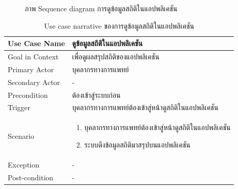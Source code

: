 \documentclass[12pt,oneside,openright,a4paper]{cpe-thai-project}
\begin{document}
\begin{itemize}
\begin{figure}[!ht]
      \caption{ภาพ Sequence diagram การดูข้อมูลสถิติในแอปพลิเคชัน}\label{fig:activity3}
     \end{figure}
     \newpage
     \begin{table}[!h]\centering
      \caption{Use case narrative ของการดูข้อมูลสถิติในแอปพลิเคชัน}\label{tbl:application1}
      \begin{tabular}{|p{4cm}|p{10cm}|} \hline
      Use Case Name & ดูข้อมูลสถิติในแอปพลิเคชัน \\ \hline
      Goal in Context & เพื่อดูผลสรุปสถิติของแอปพลิเคชัน \\ \hline
      Primary Actor & บุคลากรทางการแพทย์ \\ \hline
      Secondary Actor & - \\ \hline
      Precondition & ต้องเข้าสู่ระบบก่อน \\ \hline
      Trigger & บุคลากรทางการแพทย์ต้องเข้าสู่หน้าดูสถิติในแอปพลิเคชัน \\ \hline
      Scenario & \begin{enumerate}
        \item บุคลากรทางการแพทย์ต้องเข้าสู่หน้าดูสถิติในแอปพลิเคชัน
        \item ระบบดึงข้อมูลสถิติมาสรุปบนแอปพลิเคชัน
      \end{enumerate} \\ \hline
      Exception & - \\ \hline
      Post-condition & - \\ \hline
  
      \end{tabular}
      \end{table}
  \end{itemize}

\newpage
\end{document}
